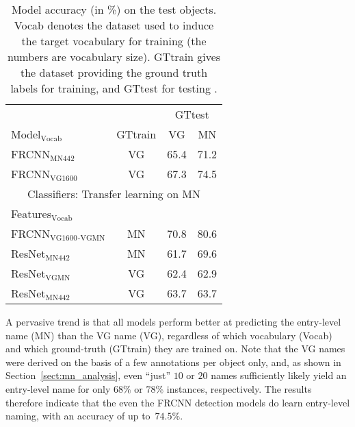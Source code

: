 \begin{table}[t]
	\centering
	\small
	\begin{tabular}{@{~}l@{~}|@{~}c@{~}|cc@{~}}
		\toprule
		&  & \multicolumn{2}{c}{GTtest} \\
		Model$_{\text{Vocab}}$ &  GTtrain &  VG & MN  \\ 
		\midrule
		FRCNN$_{\text{MN442}}$ & VG &  65.4 &      71.2   \\
		FRCNN$_{\text{VG1600}}$ & VG &    67.3 &      74.5 \\
		\midrule \midrule
		\multicolumn{4}{c}{Classifiers: Transfer learning on MN}\\
		Features$_{\text{Vocab}}$ &   \\
		\midrule 
		FRCNN$_{\text{VG1600}}$$_{\text{-VGMN}}$ & MN &    70.8 &      80.6  \\ 
		\midrule
		
		ResNet$_{\text{MN442}}$ & MN &            61.7 &              69.6  \\
		ResNet$_{\text{VGMN}}$  &   VG &  62.4 &              62.9  \\
		ResNet$_{\text{MN442}}$ & VG  &            63.7 &              63.7   \\
		\bottomrule
	\end{tabular}
	\caption{Model accuracy (in \%) on the \mn test objects. Vocab denotes the dataset used to induce the target vocabulary for training (the numbers are vocabulary size). GTtrain gives the dataset providing the ground truth labels for training, and GTtest for testing \label{tab:exp_VGvsMN}.}
	\vspace{0ex}
\end{table}

A pervasive trend is that all models perform better 
at predicting the entry-level name (MN) than the VG name (VG), regardless of which vocabulary (Vocab) and which ground-truth (GTtrain) they are trained on.  
Note that the VG names were derived on the basis of a few annotations per object only, and, as shown in Section~\ref{sect:mn_analysis}, even ``just'' $10$ or $20$ names sufficiently likely yield an entry-level name for only $68\%$ or $78\%$ instances, respectively. 
The results therefore indicate that the even the FRCNN detection models do learn entry-level naming, with an accuracy of up to~$74.5$\%.


